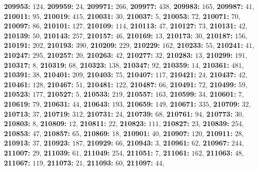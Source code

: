 \textsf{\bfseries 209953:} $124$, \textsf{\bfseries 209959:} $24$, \textsf{\bfseries 209971:} $266$, \textsf{\bfseries 209977:} $438$, \textsf{\bfseries 209983:} $165$, \textsf{\bfseries 209987:} $41$, \textsf{\bfseries 210011:} $95$, \textsf{\bfseries 210019:} $415$, \textsf{\bfseries 210031:} $30$, \textsf{\bfseries 210037:} $5$, \textsf{\bfseries 210053:} $72$, \textsf{\bfseries 210071:} $70$, \textsf{\bfseries 210097:} $86$, \textsf{\bfseries 210101:} $127$, \textsf{\bfseries 210109:} $114$, \textsf{\bfseries 210113:} $47$, \textsf{\bfseries 210127:} $73$, \textsf{\bfseries 210131:} $42$, \textsf{\bfseries 210139:} $50$, \textsf{\bfseries 210143:} $257$, \textsf{\bfseries 210157:} $46$, \textsf{\bfseries 210169:} $13$, \textsf{\bfseries 210173:} $30$, \textsf{\bfseries 210187:} $156$, \textsf{\bfseries 210191:} $202$, \textsf{\bfseries 210193:} $390$, \textsf{\bfseries 210209:} $229$, \textsf{\bfseries 210229:} $162$, \textsf{\bfseries 210233:} $55$, \textsf{\bfseries 210241:} $41$, \textsf{\bfseries 210247:} $295$, \textsf{\bfseries 210257:} $20$, \textsf{\bfseries 210263:} $42$, \textsf{\bfseries 210277:} $32$, \textsf{\bfseries 210283:} $13$, \textsf{\bfseries 210299:} $191$, \textsf{\bfseries 210317:} $8$, \textsf{\bfseries 210319:} $68$, \textsf{\bfseries 210323:} $138$, \textsf{\bfseries 210347:} $92$, \textsf{\bfseries 210359:} $14$, \textsf{\bfseries 210361:} $481$, \textsf{\bfseries 210391:} $38$, \textsf{\bfseries 210401:} $209$, \textsf{\bfseries 210403:} $75$, \textsf{\bfseries 210407:} $117$, \textsf{\bfseries 210421:} $24$, \textsf{\bfseries 210437:} $42$, \textsf{\bfseries 210461:} $128$, \textsf{\bfseries 210467:} $51$, \textsf{\bfseries 210481:} $122$, \textsf{\bfseries 210487:} $66$, \textsf{\bfseries 210491:} $72$, \textsf{\bfseries 210499:} $59$, \textsf{\bfseries 210523:} $177$, \textsf{\bfseries 210527:} $5$, \textsf{\bfseries 210533:} $219$, \textsf{\bfseries 210557:} $163$, \textsf{\bfseries 210599:} $34$, \textsf{\bfseries 210601:} $7$, \textsf{\bfseries 210619:} $79$, \textsf{\bfseries 210631:} $44$, \textsf{\bfseries 210643:} $193$, \textsf{\bfseries 210659:} $149$, \textsf{\bfseries 210671:} $335$, \textsf{\bfseries 210709:} $32$, \textsf{\bfseries 210713:} $37$, \textsf{\bfseries 210719:} $312$, \textsf{\bfseries 210731:} $24$, \textsf{\bfseries 210739:} $68$, \textsf{\bfseries 210761:} $94$, \textsf{\bfseries 210773:} $30$, \textsf{\bfseries 210803:} $8$, \textsf{\bfseries 210809:} $12$, \textsf{\bfseries 210811:} $22$, \textsf{\bfseries 210823:} $111$, \textsf{\bfseries 210827:} $23$, \textsf{\bfseries 210839:} $254$, \textsf{\bfseries 210853:} $47$, \textsf{\bfseries 210857:} $65$, \textsf{\bfseries 210869:} $18$, \textsf{\bfseries 210901:} $40$, \textsf{\bfseries 210907:} $120$, \textsf{\bfseries 210911:} $28$, \textsf{\bfseries 210913:} $37$, \textsf{\bfseries 210923:} $187$, \textsf{\bfseries 210929:} $66$, \textsf{\bfseries 210943:} $3$, \textsf{\bfseries 210961:} $62$, \textsf{\bfseries 210967:} $244$, \textsf{\bfseries 211007:} $29$, \textsf{\bfseries 211039:} $61$, \textsf{\bfseries 211049:} $254$, \textsf{\bfseries 211051:} $7$, \textsf{\bfseries 211061:} $162$, \textsf{\bfseries 211063:} $48$, \textsf{\bfseries 211067:} $119$, \textsf{\bfseries 211073:} $21$, \textsf{\bfseries 211093:} $60$, \textsf{\bfseries 211097:} $44$, 
